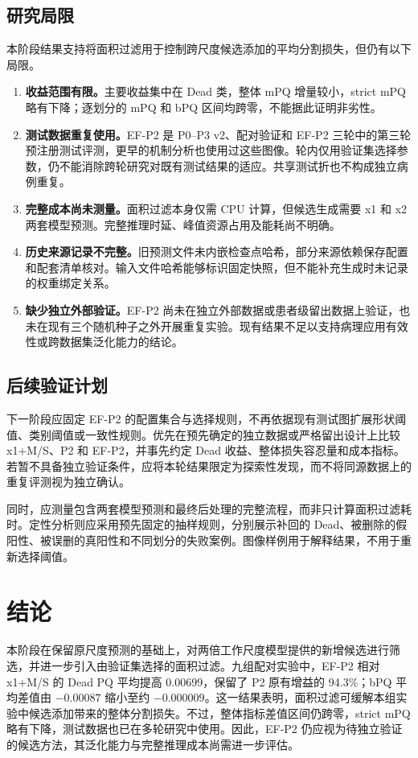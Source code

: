 \documentclass[11pt,a4paper,UTF8,fontset=fandol]{ctexart}
\begin{document}
\subsection{研究局限}

本阶段结果支持将面积过滤用于控制跨尺度候选添加的平均分割损失，但仍有以下局限。
\begin{enumerate}
\item \textbf{收益范围有限。}主要收益集中在 Dead 类，整体 mPQ 增量较小，strict mPQ 略有下降；逐划分的 mPQ 和 bPQ 区间均跨零，不能据此证明非劣性。
\item \textbf{测试数据重复使用。}EF-P2 是 P0--P3 v2、配对验证和 EF-P2 三轮中的第三轮预注册测试评测，更早的机制分析也使用过这些图像。轮内仅用验证集选择参数，仍不能消除跨轮研究对既有测试结果的适应。共享测试折也不构成独立病例重复。
\item \textbf{完整成本尚未测量。}面积过滤本身仅需 CPU 计算，但候选生成需要 x1 和 x2 两套模型预测。完整推理时延、峰值资源占用及能耗尚不明确。
\item \textbf{历史来源记录不完整。}旧预测文件未内嵌检查点哈希，部分来源依赖保存配置和配套清单核对。输入文件哈希能够标识固定快照，但不能补充生成时未记录的权重绑定关系。
\item \textbf{缺少独立外部验证。}EF-P2 尚未在独立外部数据或患者级留出数据上验证，也未在现有三个随机种子之外开展重复实验。现有结果不足以支持病理应用有效性或跨数据集泛化能力的结论。
\end{enumerate}

\subsection{后续验证计划}

下一阶段应固定 EF-P2 的配置集合与选择规则，不再依据现有测试图扩展形状阈值、类别阈值或一致性规则。优先在预先确定的独立数据或严格留出设计上比较 x1+M/S、P2 和 EF-P2，并事先约定 Dead 收益、整体损失容忍量和成本指标。若暂不具备独立验证条件，应将本轮结果限定为探索性发现，而不将同源数据上的重复评测视为独立确认。

同时，应测量包含两套模型预测和最终后处理的完整流程，而非只计算面积过滤耗时。定性分析则应采用预先固定的抽样规则，分别展示补回的 Dead、被删除的假阳性、被误删的真阳性和不同划分的失败案例。图像样例用于解释结果，不用于重新选择阈值。

\section{结论}

本阶段在保留原尺度预测的基础上，对两倍工作尺度模型提供的新增候选进行筛选，并进一步引入由验证集选择的面积过滤。九组配对实验中，EF-P2 相对 x1+M/S 的 Dead PQ 平均提高 0.00699，保留了 P2 原有增益的 94.3\%；bPQ 平均差值由 $-0.00087$ 缩小至约 $-0.000009$。这一结果表明，面积过滤可缓解本组实验中候选添加带来的整体分割损失。不过，整体指标差值区间仍跨零，strict mPQ 略有下降，测试数据也已在多轮研究中使用。因此，EF-P2 仍应视为待独立验证的候选方法，其泛化能力与完整推理成本尚需进一步评估。
\end{document}
